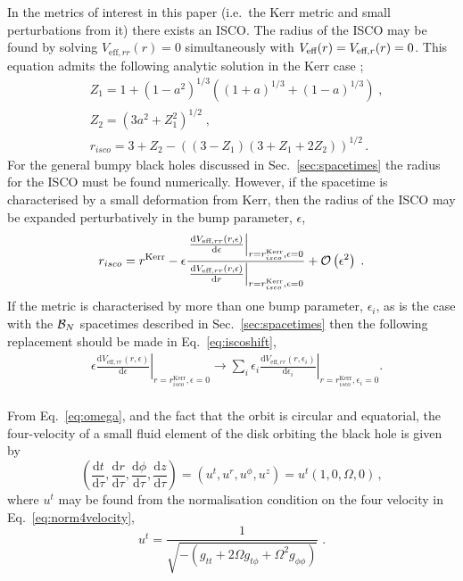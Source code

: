 In the metrics of interest in this paper (i.e.\ the Kerr metric and small perturbations from it) there exists an ISCO. The radius of the ISCO may be found by solving $V_{\textrm{eff}, r r}(r)=0$ simultaneously with $V_{\textrm{eff}}(r)\nobreak=\nobreak V_{\textrm{eff},r}(r)\nobreak=\nobreak0$. This equation admits the following analytic solution in the Kerr case \citep{1972ApJ...178..347B};
\begin{eqnarray}\label{eq:KerrISCO}
&Z_{1}=1+\left(1-a^{2}\right)^{1/3}\left((1+a)^{1/3}+(1-a)^{1/3}\right) \; ,\nonumber\\
&Z_{2}=\left(3a^{2}+Z_{1}^{2}\right)^{1/2} \; , \nonumber\\
&r_{isco}= 3+Z_{2}-\left((3-Z_{1})(3+Z_{1}+2Z_{2})\right)^{1/2}\, .
\end{eqnarray}
For the general bumpy black holes discussed in Sec.\ \ref{sec:spacetimes} the radius for the ISCO must be found numerically. However, if the spacetime is characterised by a small deformation from Kerr, then the radius of the ISCO may be expanded perturbatively in the bump parameter, $\epsilon$,
\begin{equation}\label{eq:iscoshift} r_{isco}=r^{\textrm{Kerr}}-\epsilon \frac{ \left.\frac{\textrm{d}V_{\textrm{eff},rr}(r,\epsilon)}{\textrm{d}\epsilon}\right|_{r=r^{\textrm{Kerr}}_{isco},\epsilon=0} }{\left.\frac{\textrm{d}V_{\textrm{eff},rr}(r,\epsilon)}{\textrm{d}r}\right|_{r=r^{\textrm{Kerr}}_{isco},\epsilon=0}} +{\cal{O}}\left(\epsilon^{2}\right)\; .\end{equation}
If the metric is characterised by more than one bump parameter, $\epsilon_{i}$, as is the case with the ${\cal{B}}_{N}$ spacetimes described in Sec.\ \ref{sec:spacetimes} then the following replacement should be made in Eq.\ \ref{eq:iscoshift},
\begin{eqnarray} &\epsilon\left.\frac{\textrm{d}V_{\textrm{eff},rr}(r,\epsilon)}{\textrm{d}\epsilon}\right|_{r=r_{isco}^{\textrm{Kerr}},\epsilon=0} \rightarrow\sum_{i}\epsilon_{i}\left.\frac{\textrm{d}V_{\textrm{eff},rr}(r,\epsilon_{i})}{\textrm{d}\epsilon_{i}}\right|_{r=r^{\textrm{Kerr}}_{isco},\epsilon_{i}=0} .\nonumber\\
&\end{eqnarray}

From Eq.\ \ref{eq:omega}, and the fact that the orbit is circular and equatorial, the four-velocity of a small fluid element of the disk orbiting the black hole is given by
\begin{equation}\label{eq:circorbfourvel} \left( \frac{\textrm{d}t}{\textrm{d}\tau} , \frac{\textrm{d}r}{\textrm{d}\tau} , \frac{\textrm{d}\phi}{\textrm{d}\tau} , \frac{\textrm{d}z}{\textrm{d}\tau} \right) = \left(u^{t} , u^{r} , u^{\phi} , u^{z} \right) = u^{t} \left( 1,0,\Omega , 0 \right) \, ,\end{equation}
where $u^{t}$ may be found from the normalisation condition on the four velocity in Eq.\ \ref{eq:norm4velocity},
\begin{equation}\label{eq:four:vel} u^{t} = \frac{1}{\sqrt{-\left( g_{tt}+2\Omega g_{t\phi} +\Omega^{2}g_{\phi\phi} \right)}} \; .\end{equation}

